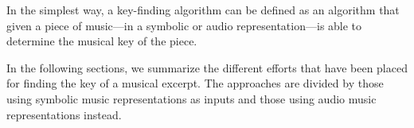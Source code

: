 


In the simplest way, a key-finding algorithm can be defined as an algorithm that given a piece of music---in a symbolic or audio representation---is able to determine the musical key of the piece.

In the following sections, we summarize the different efforts that have been placed for finding the key of a musical excerpt. The approaches are divided by those using symbolic music representations as inputs and those using audio music representations instead.






